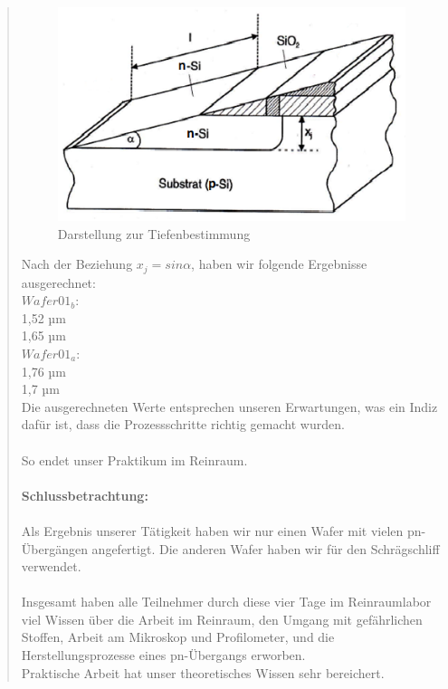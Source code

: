 \begin{quote}
    		\begin{figure}[H]
				\hspace{2 cm}
                  \includegraphics[scale=1, trim = 0cm 0cm 0cm 0cm,clip]
                	{./HerstellungBilder/SchematischeDarstellungzumAusrechnenderpnTiefe.png}
                  \caption{Darstellung zur Tiefenbestimmung}
                \label{fig:dartief}
            \end{figure}

    		\vspace{2em}

			Nach  der Beziehung $x_j=sin \alpha$, haben wir folgende Ergebnisse
			ausgerechnet:\\

			$Wafer01_b:$\\
			1,52 µm \\
			1,65 µm \\

			$Wafer01_a:$\\

			1,76 µm\\
			1,7 µm\\


			Die ausgerechneten Werte entsprechen unseren Erwartungen, was ein
			Indiz dafür ist, dass die Prozessschritte richtig gemacht wurden.\\
			\\
			So endet unser Praktikum im Reinraum. \\
			\\
			\textbf{Schlussbetrachtung:}\\
			\\
			Als Ergebnis unserer Tätigkeit haben wir nur einen Wafer mit vielen
			pn-Übergängen angefertigt. Die anderen Wafer haben wir für den
			Schrägschliff verwendet.\\
			\\
			Insgesamt haben alle Teilnehmer durch diese vier Tage im
			Reinraumlabor viel Wissen über die Arbeit im Reinraum, den Umgang
			mit gefährlichen Stoffen, Arbeit am Mikroskop und Profilometer, und
			die Herstellungsprozesse eines pn-Übergangs erworben.\\
			Praktische Arbeit hat unser theoretisches Wissen sehr bereichert.


\end{quote}

